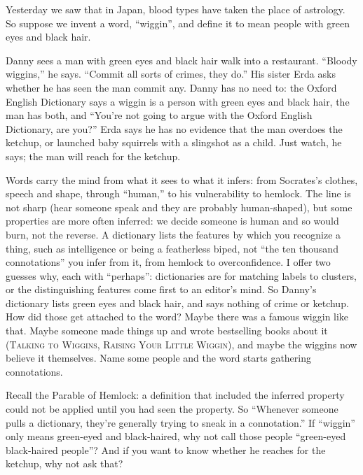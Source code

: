 
Yesterday we saw that in Japan, blood types have taken the place of astrology. So suppose we invent a word, ``wiggin'', and define it to mean people with green eyes and black hair.

Danny sees a man with green eyes and black hair walk into a restaurant. ``Bloody wiggins,'' he says. ``Commit all sorts of crimes, they do.'' His sister Erda asks whether he has seen the man commit any. Danny has no need to: the Oxford English Dictionary says a wiggin is a person with green eyes and black hair, the man has both, and ``You're not going to argue with the Oxford English Dictionary, are you?'' Erda says he has no evidence that the man overdoes the ketchup, or launched baby squirrels with a slingshot as a child. Just watch, he says; the man will reach for the ketchup.

Words carry the mind from what it sees to what it infers: from Socrates's clothes, speech and shape, through ``human,'' to his vulnerability to hemlock. The line is not sharp (hear someone speak and they are probably human-shaped), but some properties are more often inferred: we decide someone is human and so would burn, not the reverse. A dictionary lists the features by which you recognize a thing, such as intelligence or being a featherless biped, not ``the ten thousand connotations'' you infer from it, from hemlock to overconfidence. I offer two guesses why, each with ``perhaps'': dictionaries are for matching labels to clusters, or the distinguishing features come first to an editor's mind. So Danny's dictionary lists green eyes and black hair, and says nothing of crime or ketchup. How did those get attached to the word? Maybe there was a famous wiggin like that. Maybe someone made things up and wrote bestselling books about it (\textsc{Talking to Wiggins}, \textsc{Raising Your Little Wiggin}), and maybe the wiggins now believe it themselves. Name some people and the word starts gathering connotations. 

Recall the Parable of Hemlock: a definition that included the inferred property could not be applied until you had seen the property. So ``Whenever someone pulls a dictionary, they're generally trying to sneak in a connotation.'' If ``wiggin'' only means green-eyed and black-haired, why not call those people ``green-eyed black-haired people''?  And if you want to know whether he reaches for the ketchup, why not ask that?

